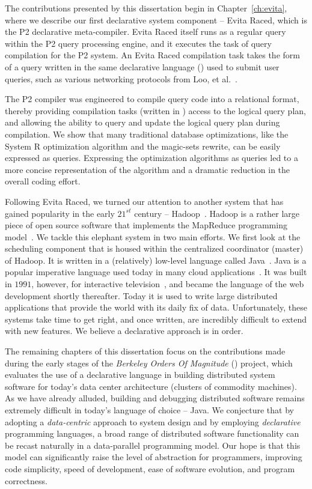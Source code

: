 The contributions presented by this dissertation begin in
Chapter~\ref{ch:evita}, where we describe our first declarative system
component -- Evita Raced, which is the P2 declarative meta-compiler.  Evita
Raced itself runs as a regular query within the P2 query processing engine, and
it executes the task of query compilation for the P2 system.  An Evita Raced
compilation task takes the form of a query written in the same declarative
language (\OVERLOG) used to submit user queries, such as various networking
protocols from Loo, et al.~\cite{loo-sigmod06, p2:sosp}.  

The P2 compiler was engineered to compile query code into a relational format,
thereby providing compilation tasks (written in \OVERLOG) access to the logical
query plan, and allowing the ability to query and update the logical query plan
during compilation.  We show that many traditional database optimizations, like
the System R optimization algorithm and the magic-sets rewrite, can be easily
expressed as \OVERLOG queries.  Expressing the optimization algorithms as
\OVERLOG queries led to a more concise representation of the algorithm and a
dramatic reduction in the overall coding effort.
 
Following Evita Raced, we turned our attention to another system that has
gained popularity in the early $21^{st}$ century -- Hadoop~\cite{hadoop}.
Hadoop is a rather large piece of open source software that implements the
MapReduce programming model~\cite{mapreduce-osdi}.  We tackle this elephant
system in two main efforts.  We first look at the scheduling component that
is housed within the centralized coordinator (master) of Hadoop.  It is written
in a (relatively) low-level language called Java~\cite{java}.  Java is a
popular imperative language used today in many cloud
applications~\cite{pig-sigmod, hive-vldb, zookeeper, hbase, cassandra}.
It was built in $1991$, however, for interactive television~\cite{java-history},
and became the language of the web development shortly thereafter.  Today it is
used to write large distributed applications that provide the world with its
daily fix of data.  Unfortunately, these systems take time to get right, and once
written, are incredibly difficult to extend with new features.  We believe a
declarative approach is in order.

The remaining chapters of this dissertation focus on the contributions made
during the early stages of the {\em Berkeley Orders Of Magnitude} (\BOOM)
project, which evaluates the use of a declarative language in building
distributed system software for today's data center architecture (clusters of
commodity machines).  As we have already alluded, building and debugging
distributed software remains extremely difficult in today's language of choice
-- Java.  We conjecture that by adopting a \emph{data-centric} approach to
system design and by employing \emph{declarative} programming languages, a
broad range of distributed software functionality can be recast naturally in a
data-parallel programming model.  Our hope is that this model can significantly
raise the level of abstraction for programmers, improving code simplicity,
speed of development, ease of software evolution, and program correctness.

